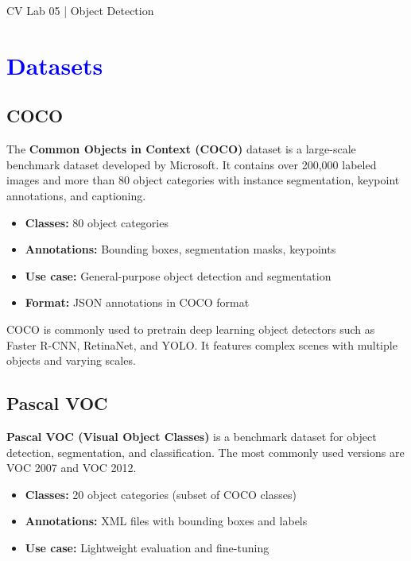 \documentclass[10pt]{article}
\begin{document}
	
	\begin{center}
		{\Huge{CV Lab 05 | Object Detection}} \\
		\vspace{2mm}
	\end{center}
	
	\section*{\textcolor{blue}{Datasets}}
	\subsection{COCO }
	The \textbf{Common Objects in Context (COCO)} dataset is a large-scale benchmark dataset developed by Microsoft. It contains over 200,000 labeled images and more than 80 object categories with instance segmentation, keypoint annotations, and captioning.
	
	\begin{itemize}
		\item \textbf{Classes:} 80 object categories
		\item \textbf{Annotations:} Bounding boxes, segmentation masks, keypoints
		\item \textbf{Use case:} General-purpose object detection and segmentation
		\item \textbf{Format:} JSON annotations in COCO format
	\end{itemize}
	
	COCO is commonly used to pretrain deep learning object detectors such as Faster R-CNN, RetinaNet, and YOLO. It features complex scenes with multiple objects and varying scales.
	
	\subsection{Pascal VOC}
	\textbf{Pascal VOC (Visual Object Classes)} is a benchmark dataset for object detection, segmentation, and classification. The most commonly used versions are VOC 2007 and VOC 2012.
	
	\begin{itemize}
		\item \textbf{Classes:} 20 object categories (subset of COCO classes)
		\item \textbf{Annotations:} XML files with bounding boxes and labels
		\item \textbf{Use case:} Lightweight evaluation and fine-tuning
	\end{itemize}
	
\end{document}
